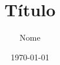 \documentclass[12pt]{article}
\title{Título}
\author{Nome}
\date{\today}
\begin{document}
    \maketitle

\nocite{*}


\end{document}
